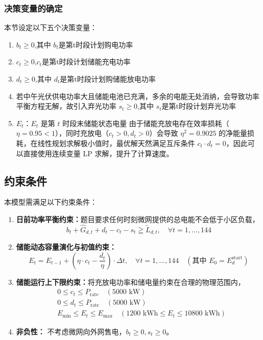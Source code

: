 \documentclass{cumcmthesis}
\begin{document}
\subsubsection{决策变量的确定}
本节设定以下五个决策变量：
\begin{enumerate}
    \item \textbf{$b_t \geqslant 0$},其中 $b_t$是第t时段计划购电功率
    \item \textbf{$c_t\geqslant 0$},$c_t$是第t时段计划储能充电功率
    \item \textbf{$d_t \geqslant 0$},其中 $d_t$是第t时段计划购储能放电功率
    \item  若中午光伏供电功率大且储能电池已充满，多余的电能无处消纳，会导致功率平衡方程无解，故引入弃光功率 \newline
    \hspace*{2em} \textbf{$s_t \geqslant 0$},其中 $s_t$是第t时段计划弃光功率
    \item \textbf{$E_t$}：$E_t$ 是第 $t$ 时段末储能状态电量 \newline  \hspace*{2em}由于储能充放电存在效率损耗（$\eta=0.95<1$），同时充放电（$c_t>0,d_t>0$）会导致 $\eta^2=0.9025$ 的净能量损耗，在线性规划求解极小值时，最优解天然满足互斥条件 $c_t\cdot d_t=0$，因此可以直接使用连续变量 LP 求解，提升了计算速度。
\end{enumerate}
        \subsection{约束条件}
        本模型需满足以下约束条件：
        \begin{enumerate}
    \item \textbf{日前功率平衡约束：}题目要求任何时刻微网提供的总电能不会低于小区负载，
    \begin{equation}
        b_t + \hat{G}_{d,t} + d_t - c_t - s_t \geqq  \tilde{L}_{d,t}, \quad \forall t = 1, \dots, 144
    \end{equation}
\item \textbf{储能动态容量演化与初值约束：}
    \begin{equation}
        E_t = E_{t-1} + \left( \eta \cdot c_t - \frac{d_t}{\eta} \right) \cdot \Delta t, \quad \forall t = 1, \dots, 144 \quad (\text{其中 } E_0 = E_d^{\text{start}})
    \end{equation}
\item \textbf{储能运行上下限约束：}将充放电功率和储电量约束在合理的物理范围内，
    \begin{align}
        & 0 \le c_t \le P_{\text{rate}} \quad (5000\text{ kW}) \\
        & 0 \le d_t \le P_{\text{rate}} \quad (5000\text{ kW}) \\
        & E_{\min} \le E_t \le E_{\max} \quad (1200\text{ kWh} \le E_t \le 10800\text{ kWh})
    \end{align}
\item \textbf{非负性：} 不考虑微网向外网售电，\newline  \hspace*{2em}$b_t \ge 0, s_t \ge 0$。
\end{enumerate}
\end{document}
